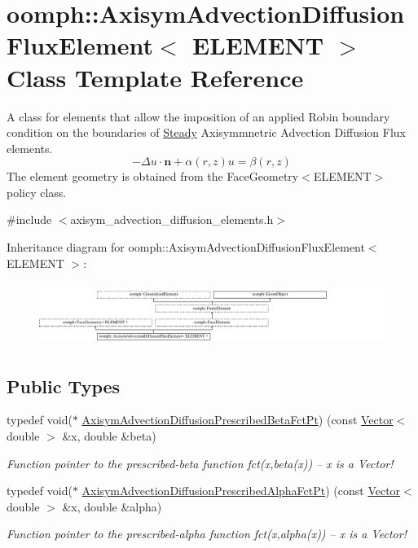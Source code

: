 \hypertarget{classoomph_1_1AxisymAdvectionDiffusionFluxElement}{}\section{oomph\+:\+:Axisym\+Advection\+Diffusion\+Flux\+Element$<$ E\+L\+E\+M\+E\+NT $>$ Class Template Reference}
\label{classoomph_1_1AxisymAdvectionDiffusionFluxElement}


A class for elements that allow the imposition of an applied Robin boundary condition on the boundaries of \hyperlink{classoomph_1_1Steady}{Steady} Axisymmnetric Advection Diffusion Flux elements. \[ -\Delta u \cdot \mathbf{n} + \alpha(r,z) u = \beta(r,z) \] The element geometry is obtained from the Face\+Geometry$<$\+E\+L\+E\+M\+E\+N\+T$>$ policy class.  




{\ttfamily \#include $<$axisym\+\_\+advection\+\_\+diffusion\+\_\+elements.\+h$>$}

Inheritance diagram for oomph\+:\+:Axisym\+Advection\+Diffusion\+Flux\+Element$<$ E\+L\+E\+M\+E\+NT $>$\+:\begin{figure}[H]
\begin{center}
\leavevmode
\includegraphics[height=2.074074cm]{classoomph_1_1AxisymAdvectionDiffusionFluxElement}
\end{center}
\end{figure}
\subsection*{Public Types}
\begin{DoxyCompactItemize}
\item 
typedef void($\ast$ \hyperlink{classoomph_1_1AxisymAdvectionDiffusionFluxElement_ad4453706dae676758946691686e1a1c3}{Axisym\+Advection\+Diffusion\+Prescribed\+Beta\+Fct\+Pt}) (const \hyperlink{classoomph_1_1Vector}{Vector}$<$ double $>$ \&x, double \&beta)
\begin{DoxyCompactList}\small\item\em Function pointer to the prescribed-\/beta function fct(x,beta(x)) -- x is a Vector! \end{DoxyCompactList}\item 
typedef void($\ast$ \hyperlink{classoomph_1_1AxisymAdvectionDiffusionFluxElement_aa0922f19043ccc259c61c704fa3b5767}{Axisym\+Advection\+Diffusion\+Prescribed\+Alpha\+Fct\+Pt}) (const \hyperlink{classoomph_1_1Vector}{Vector}$<$ double $>$ \&x, double \&alpha)
\begin{DoxyCompactList}\small\item\em Function pointer to the prescribed-\/alpha function fct(x,alpha(x)) -- x is a Vector! \end{DoxyCompactList}\end{DoxyCompactItemize}
